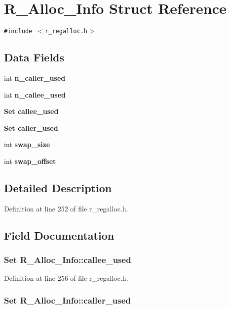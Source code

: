 \section{R\_\-Alloc\_\-Info Struct Reference}
\label{structR__Alloc__Info}
{\tt \#include $<$r\_\-regalloc.h$>$}

\subsection*{Data Fields}
\begin{CompactItemize}
\item 
int \bf{n\_\-caller\_\-used}
\item 
int \bf{n\_\-callee\_\-used}
\item 
\bf{Set} \bf{callee\_\-used}
\item 
\bf{Set} \bf{caller\_\-used}
\item 
int \bf{swap\_\-size}
\item 
int \bf{swap\_\-offset}
\end{CompactItemize}


\subsection{Detailed Description}




Definition at line 252 of file r\_\-regalloc.h.

\subsection{Field Documentation}
\subsubsection{\setlength{\rightskip}{0pt plus 5cm}\bf{Set} \bf{R\_\-Alloc\_\-Info::callee\_\-used}}\label{structR__Alloc__Info_4a46561deee92392494776a4a813d097}




Definition at line 256 of file r\_\-regalloc.h.
\subsubsection{\setlength{\rightskip}{0pt plus 5cm}\bf{Set} \bf{R\_\-Alloc\_\-Info::caller\_\-used}}\label{structR__Alloc__Info_7abaca33e0d1e99cd5ddc32b54a5d8f0}




